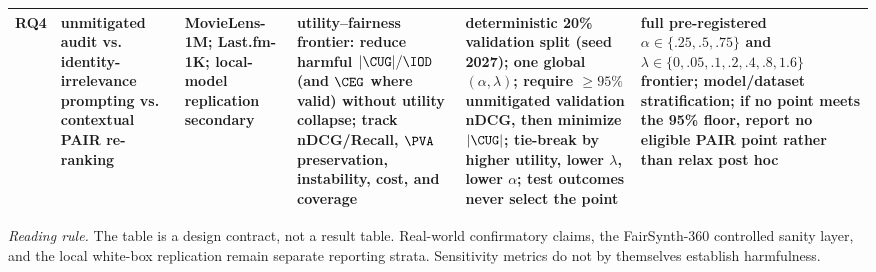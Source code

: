 \begin{table}[t]
{\begin{tabular}{@{}p{0.72cm}p{3.80cm}p{2.65cm}p{4.30cm}p{4.30cm}p{4.45cm}@{}}
\addlinespace[1pt]
\textbf{RQ4}
& unmitigated audit vs. identity-irrelevance prompting vs. contextual PAIR re-ranking
& MovieLens-1M; Last.fm-1K; local-model replication secondary
& utility--fairness frontier: reduce harmful $|\CUG|/\IOD$ (and $\CEG$ where valid) without utility collapse; track nDCG/Recall, $\PVA$ preservation, instability, cost, and coverage
& deterministic 20\% validation split (seed 2027); one global $(\alpha,\lambda)$; require $\geq95\%$ unmitigated validation nDCG, then minimize $|\CUG|$; tie-break by higher utility, lower $\lambda$, lower $\alpha$; test outcomes never select the point
& full pre-registered $\alpha\in\{.25,.5,.75\}$ and $\lambda\in\{0,.05,.1,.2,.4,.8,1.6\}$ frontier; model/dataset stratification; if no point meets the 95\% floor, report no eligible PAIR point rather than relax post hoc \\
\bottomrule
\end{tabular}}

\vspace{0.5mm}
\parbox{0.985\textwidth}{\scriptsize
\textit{Reading rule.} The table is a design contract, not a result table. Real-world confirmatory claims, the FairSynth-360 controlled sanity layer, and the local white-box replication remain separate reporting strata. Sensitivity metrics do not by themselves establish harmfulness.}
\end{table}
